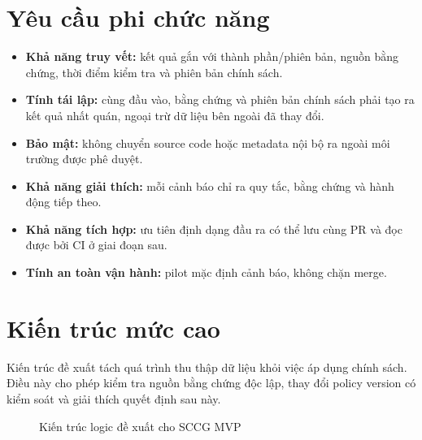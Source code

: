 \section{Yêu cầu phi chức năng}
\begin{itemize}
    \item \textbf{Khả năng truy vết:} kết quả gắn với thành phần/phiên bản, nguồn bằng chứng, thời điểm kiểm tra và phiên bản chính sách.
    \item \textbf{Tính tái lập:} cùng đầu vào, bằng chứng và phiên bản chính sách phải tạo ra kết quả nhất quán, ngoại trừ dữ liệu bên ngoài đã thay đổi.
    \item \textbf{Bảo mật:} không chuyển source code hoặc metadata nội bộ ra ngoài môi trường được phê duyệt.
    \item \textbf{Khả năng giải thích:} mỗi cảnh báo chỉ ra quy tắc, bằng chứng và hành động tiếp theo.
    \item \textbf{Khả năng tích hợp:} ưu tiên định dạng đầu ra có thể lưu cùng PR và đọc được bởi CI ở giai đoạn sau.
    \item \textbf{Tính an toàn vận hành:} pilot mặc định cảnh báo, không chặn merge.
\end{itemize}

\section{Kiến trúc mức cao}
Kiến trúc đề xuất tách quá trình thu thập dữ liệu khỏi việc áp dụng chính sách. Điều này cho phép kiểm tra nguồn bằng chứng độc lập, thay đổi policy version có kiểm soát và giải thích quyết định sau này.

\begin{figure}[H]
\centering
{}
\caption{Kiến trúc logic đề xuất cho SCCG MVP}
\label{fig:sccg-architecture}
\end{figure}

